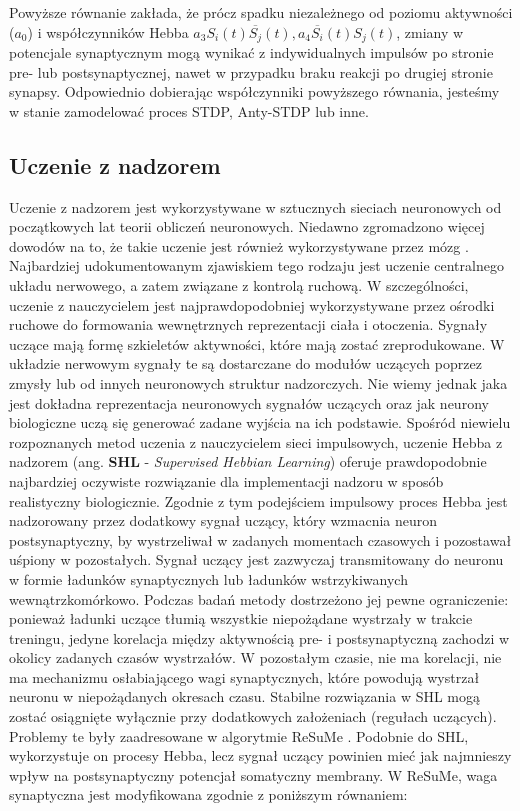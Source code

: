 Powyższe równanie zakłada, że prócz spadku niezależnego od poziomu aktywności ($a_0$) i współczynników Hebba $a_3 S_i(t)\overline{S_j}(t), a_4 \overline{S_i}(t) S_j(t)$, zmiany w potencjale synaptycznym mogą wynikać z indywidualnych impulsów po stronie pre- lub postsynaptycznej, nawet w przypadku braku reakcji po drugiej stronie synapsy. Odpowiednio dobierając współczynniki powyższego równania, jesteśmy w stanie zamodelować proces STDP, Anty-STDP lub inne.

\subsection{Uczenie z nadzorem}
Uczenie z nadzorem jest wykorzystywane w sztucznych sieciach neuronowych od początkowych lat teorii obliczeń neuronowych. Niedawno zgromadzono więcej dowodów na to, że takie uczenie jest również wykorzystywane przez mózg \cite{Knudsen94}. Najbardziej udokumentowanym zjawiskiem tego rodzaju jest uczenie centralnego układu nerwowego, a zatem związane z kontrolą ruchową. W szczególności, uczenie z nauczycielem jest najprawdopodobniej wykorzystywane przez ośrodki ruchowe do formowania wewnętrznych reprezentacji ciała i otoczenia.
Sygnały uczące mają formę szkieletów aktywności, które mają zostać zreprodukowane. W układzie nerwowym sygnały te są dostarczane do modułów uczących poprzez zmysły lub od innych neuronowych struktur nadzorczych. Nie wiemy jednak jaka jest dokładna reprezentacja neuronowych sygnałów uczących oraz jak neurony biologiczne uczą się generować zadane wyjścia na ich podstawie. 
Spośród niewielu rozpoznanych metod uczenia z nauczycielem sieci impulsowych, uczenie Hebba z nadzorem (ang. \textbf{SHL} - \textit{Supervised Hebbian Learning}) oferuje prawdopodobnie najbardziej oczywiste rozwiązanie dla implementacji nadzoru w sposób realistyczny biologicznie. Zgodnie z tym podejściem impulsowy proces Hebba jest nadzorowany przez dodatkowy sygnał uczący, który wzmacnia neuron postsynaptyczny, by wystrzeliwał w zadanych momentach czasowych i pozostawał uśpiony w pozostałych. Sygnał uczący jest zazwyczaj transmitowany do neuronu w formie ładunków synaptycznych lub ładunków wstrzykiwanych wewnątrzkomórkowo. Podczas badań metody dostrzeżono jej pewne ograniczenie: ponieważ ładunki uczące tłumią wszystkie niepożądane wystrzały w trakcie treningu, jedyne korelacja między aktywnością pre- i postsynaptyczną zachodzi w okolicy zadanych czasów wystrzałów. W pozostałym czasie, nie ma korelacji, nie ma mechanizmu osłabiającego wagi synaptycznych, które powodują wystrzał neuronu w niepożądanych okresach czasu. Stabilne rozwiązania w SHL mogą zostać osiągnięte wyłącznie przy dodatkowych założeniach (regułach uczących). 
Problemy te były zaadresowane w algorytmie ReSuMe \cite{Ponulak2011}. Podobnie do SHL, wykorzystuje on procesy Hebba, lecz sygnał uczący powinien mieć jak najmnieszy wpływ na postsynaptyczny potencjał somatyczny membrany. W ReSuMe, waga synaptyczna jest modyfikowana zgodnie z poniższym równaniem:
 
